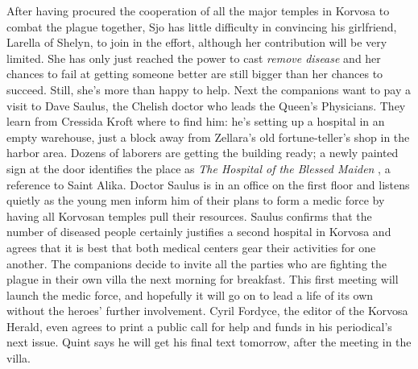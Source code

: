 After having procured the cooperation of all the major temples in Korvosa to combat the plague together, Sjo has little difficulty in convincing his girlfriend, Larella of Shelyn, to join in the effort, although her contribution will be very limited. She has only just reached the power to cast {\itshape remove disease} and her chances to fail at getting someone better are still bigger than her chances to succeed. Still, she's more than happy to help. Next the companions want to pay a visit to Dave Saulus, the Chelish doctor who leads the Queen's Physicians. They learn from Cressida Kroft where to find him: he's setting up a hospital in an empty warehouse, just a block away from Zellara's old fortune-teller's shop in the harbor area. Dozens of laborers are getting the building ready; a newly painted sign at the door identifies the place as {\itshape The Hospital of the Blessed Maiden} , a reference to Saint Alika. Doctor Saulus is in an office on the first floor and listens quietly as the young men inform him of their plans to form a medic force by having all Korvosan temples pull their resources. Saulus confirms that the number of diseased people certainly justifies a second hospital in Korvosa and agrees that it is best that both medical centers gear their activities for one another. The companions decide to invite all the parties who are fighting the plague in their own villa the next morning for breakfast. This first meeting will launch the medic force, and hopefully it will go on to lead a life of its own without the heroes' further involvement. Cyril Fordyce, the editor of the Korvosa Herald, even agrees to print a public call for help and funds in his periodical's next issue. Quint says he will get his final text tomorrow, after the meeting in the villa.\\

